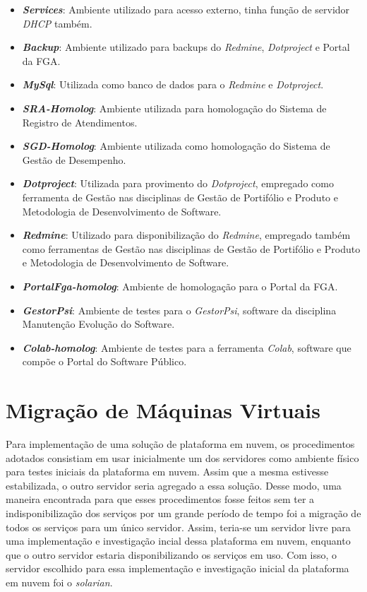 \begin{itemize}
  \item \textbf{\textit{Services}}: Ambiente utilizado para acesso externo, tinha função de servidor \textit{DHCP} também.
  \item \textbf{\textit{Backup}}: Ambiente utilizado para backups do \textit{Redmine}, \textit{Dotproject} e Portal da FGA.
  \item \textbf{\textit{MySql}}: Utilizada como banco de dados para o \textit{Redmine} e \textit{Dotproject}.
  \item \textbf{\textit{SRA-Homolog}}: Ambiente utilizada para homologação do Sistema de Registro de Atendimentos.
  \item \textbf{\textit{SGD-Homolog}}: Ambiente utilizada como homologação do Sistema de Gestão de Desempenho.
  \item \textbf{\textit{Dotproject}}: Utilizada para provimento do \textit{Dotproject}, empregado como ferramenta de Gestão nas disciplinas de Gestão de Portifólio e Produto e Metodologia de Desenvolvimento de Software.
  \item \textbf{\textit{Redmine}}: Utilizado para disponibilização do \textit{Redmine}, empregado também como ferramentas de Gestão nas disciplinas de Gestão de Portifólio e Produto e Metodologia de Desenvolvimento de Software.
  \item \textbf{\textit{PortalFga-homolog}}: Ambiente de homologação para o Portal da FGA.
  \item \textbf{\textit{GestorPsi}}: Ambiente de testes para o \textit{GestorPsi}, software da disciplina Manutenção Evolução do Software.
  \item \textbf{\textit{Colab-homolog}}: Ambiente de testes para a ferramenta \textit{Colab}, software que compõe o Portal do Software Público.
\end{itemize}



\section{Migração de Máquinas Virtuais}
Para implementação de uma solução de plataforma em nuvem, os procedimentos adotados consistiam em usar inicialmente um dos servidores como ambiente físico  para testes iniciais da plataforma em nuvem. Assim que a mesma estivesse estabilizada, o outro servidor seria agregado a essa solução. Desse modo, uma maneira encontrada para que esses procedimentos fosse feitos sem ter a indisponibilização dos serviços por um grande período de tempo foi a migração de todos os serviços para um único servidor. Assim, teria-se um servidor livre para uma implementação e investigação incial dessa plataforma em nuvem, enquanto que o outro servidor estaria disponibilizando os serviços em uso. Com isso, o servidor escolhido para essa implementação e investigação inicial da plataforma em nuvem foi o \textit{solarian}. 

